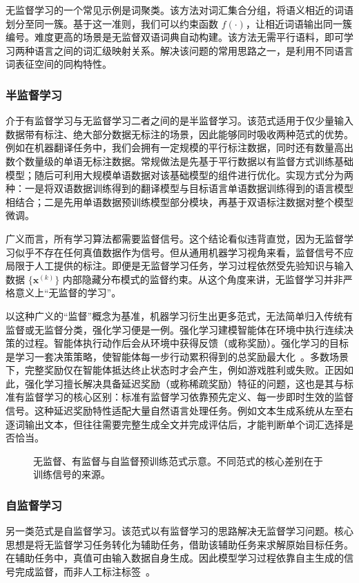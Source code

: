 无监督学习的一个常见示例是词聚类。该方法对词汇集合分组，将语义相近的词语划分至同一簇。基于这一准则，我们可以约束函数 $f(\cdot)$，让相近词语输出同一簇编号。难度更高的场景是无监督双语词典自动构建。该方法无需平行语料，即可学习两种语言之间的词汇级映射关系。解决该问题的常用思路之一，是利用不同语言词表征空间的同构特性。

\subsubsection{半监督学习}
介于有监督学习与无监督学习二者之间的是半监督学习。该范式适用于仅少量输入数据带有标注、绝大部分数据无标注的场景，因此能够同时吸收两种范式的优势。例如在机器翻译任务中，我们会拥有一定规模的平行标注数据，同时还有数量高出数个数量级的单语无标注数据。常规做法是先基于平行数据以有监督方式训练基础模型；随后可利用大规模单语数据对该基础模型的组件进行优化。实现方式分为两种：一是将双语数据训练得到的翻译模型与目标语言单语数据训练得到的语言模型相结合；二是先用单语数据预训练模型部分模块，再基于双语标注数据对整个模型微调。

广义而言，所有学习算法都需要监督信号。这个结论看似违背直觉，因为无监督学习似乎不存在任何真值数据作为信号。但从通用机器学习视角来看，监督信号不应局限于人工提供的标注。即便是无监督学习任务，学习过程依然受先验知识与输入数据 $\{\mathbf{x}^{(k)}\}$ 内部隐藏分布模式的监督约束。从这个角度来讲，无监督学习并非严格意义上“无监督的学习”。

以这种广义的“监督”概念为基准，机器学习衍生出更多范式，无法简单归入传统有监督或无监督分类，强化学习便是一例。强化学习建模智能体在环境中执行连续决策的过程。智能体执行动作后会从环境中获得反馈（或称奖励）。强化学习的目标是学习一套决策策略，使智能体每一步行动累积得到的总奖励最大化~\cite{SuttonBarto2018RL}。多数场景下，完整奖励仅在智能体抵达终止状态时才会产生，例如游戏胜利或失败。正因如此，强化学习擅长解决具备延迟奖励（或称稀疏奖励）特征的问题，这也是其与标准有监督学习的核心区别：标准有监督学习依靠预先定义、每一步即时生效的监督信号。这种延迟奖励特性适配大量自然语言处理任务。例如文本生成系统从左至右逐词输出文本，但往往需要完整生成全文并完成评估后，才能判断单个词汇选择是否恰当。

\begin{figure}[htbp]
  \centering
  
  \caption{无监督、有监督与自监督预训练范式示意。不同范式的核心差别在于训练信号的来源。}
  \label{fig:nlpbook-learning-paradigms}
\end{figure}

\subsubsection{自监督学习}
另一类范式是自监督学习。该范式以有监督学习的思路解决无监督学习问题。核心思想是将无监督学习任务转化为辅助任务，借助该辅助任务来求解原始目标任务。在辅助任务中，真值可由输入数据自身生成。因此模型学习过程依靠自主生成的信号完成监督，而非人工标注标签~\cite{BengioEtAl2013Representation}。


